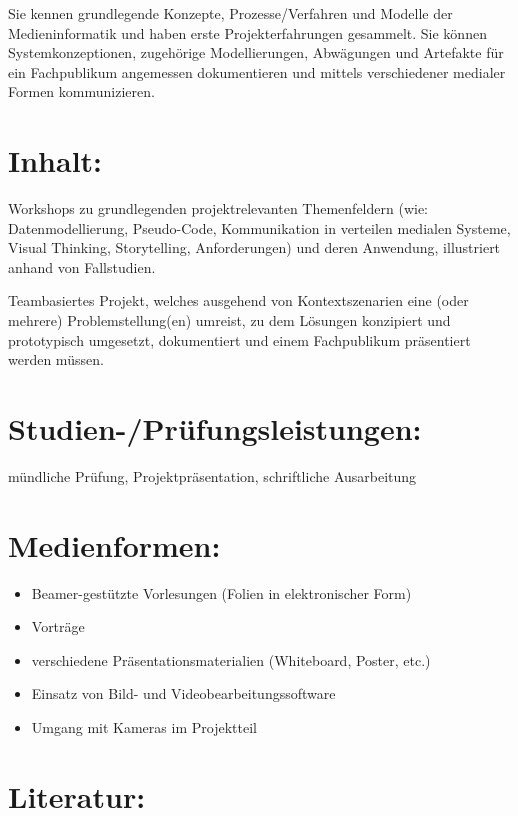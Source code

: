 Sie kennen grundlegende Konzepte, Prozesse/Verfahren und Modelle der
Medieninformatik und haben erste Projekterfahrungen gesammelt. Sie
können Systemkonzeptionen, zugehörige Modellierungen, Abwägungen und
Artefakte für ein Fachpublikum angemessen dokumentieren und mittels
verschiedener medialer Formen kommunizieren.

\section{Inhalt:}\label{inhalt-9}

Workshops zu grundlegenden projektrelevanten Themenfeldern (wie:
Datenmodellierung, Pseudo-Code, Kommunikation in verteilen medialen
Systeme, Visual Thinking, Storytelling, Anforderungen) und deren
Anwendung, illustriert anhand von Fallstudien.

Teambasiertes Projekt, welches ausgehend von Kontextszenarien eine (oder
mehrere) Problemstellung(en) umreist, zu dem Lösungen konzipiert und
prototypisch umgesetzt, dokumentiert und einem Fachpublikum präsentiert
werden müssen.

\section{Studien-/Prüfungsleistungen:}\label{studien-pruxfcfungsleistungen-9}

mündliche Prüfung, Projektpräsentation, schriftliche Ausarbeitung

\section{Medienformen:}\label{medienformen-9}

\begin{itemize}
\tightlist
\item
  Beamer-gestützte Vorlesungen (Folien in elektronischer Form)
\item
  Vorträge
\item
  verschiedene Präsentationsmaterialien (Whiteboard, Poster, etc.)
\item
  Einsatz von Bild- und Videobearbeitungssoftware
\item
  Umgang mit Kameras im Projektteil
\end{itemize}

\section{Literatur:}\label{literatur-9}

